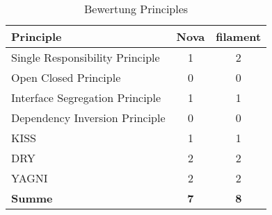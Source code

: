 \begin{table}[]
    \caption{Bewertung Principles}
    \label{tab:bewertung-principles}
    \centering
    \begin{tabular}{|l|c|c|}
        \hline
        \textbf{Principle}              & \textbf{Nova} & \textbf{filament} \\ \hline
        Single Responsibility Principle & 1             & 2                 \\ \hline
        Open Closed Principle           & 0             & 0                 \\ \hline
        Interface Segregation Principle & 1             & 1                 \\ \hline
        Dependency Inversion Principle  & 0             & 0                 \\ \hline
        KISS                            & 1             & 1                 \\ \hline
        DRY                             & 2             & 2                 \\ \hline
        YAGNI                           & 2             & 2                 \\ \hline
        \textbf{Summe}                  & \textbf{7}    & \textbf{8}        \\ \hline
    \end{tabular}
\end{table}
